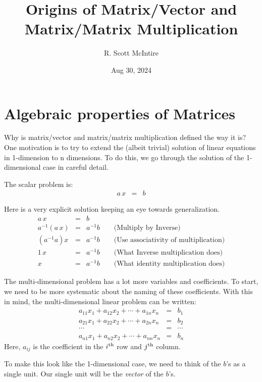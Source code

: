 \documentclass{article}
\title{Origins of Matrix/Vector and Matrix/Matrix Multiplication}
\author{R. Scott McIntire}
\date{Aug 30, 2024}
\begin{document}
\maketitle


\section{Algebraic properties of Matrices}
Why is matrix/vector and matrix/matrix multiplication defined the way it is?
One motivation is to try to extend the (albeit trivial) solution of linear
equations in 1-dimension to n dimensions. To do this, we go through the solution
of the 1-dimensional case in careful detail.

The scalar problem is:
\begin{eqnarray}
  a \, x & = & b \label{scalar-problem}
\end{eqnarray}

Here is a very explicit solution keeping an eye towards generalization.
\begin{eqnarray}
  a \, x & = & b \\
  a^{-1} ( a \, x ) & = & a^{-1} b \quad \quad \text{(Multiply by Inverse)} \label{inv} \\
  (a^{-1} a) x & = & a^{-1} b \quad \quad \text{(Use associativity of multiplication)} \label{assoc} \\
  1 \, x & = & a^{-1} b \quad \quad \text{(What Inverse multiplication does)} \label{inv-mult} \\
  x & = & a^{-1} b \quad \quad \text{(What identity multiplication does)} \label{identity}
\end{eqnarray}

The multi-dimensional problem has a lot more variables and coefficients.
To start, we need to be more systematic about the naming of these coefficients.
With this in mind, the multi-dimensional linear problem can be written:
\begin{eqnarray*}
  a_{11} x_1 + a_{12} x_2 + \cdots + a_{1n} x_n & = & b_1 \\
  a_{21} x_1 + a_{22} x_2 + \cdots + a_{2n} x_n & = & b_2 \\
  \cdots & = & \cdots \\
  a_{n1} x_1 + a_{n2} x_2 + \cdots + a_{nn} x_n & = & b_n 
\end{eqnarray*}
Here, $a_{ij}$ is the coefficient in the $i^{\rm th}$ row and $j^{\rm th}$ column.


To make this look like the 1-dimensional case, we need to think of the $b$'s as
a single unit. Our single unit will be the {\em vector\/} of the $b$'s.
\end{document}
